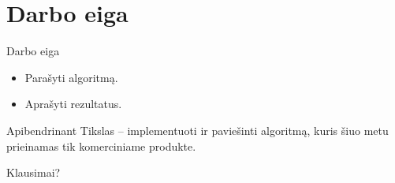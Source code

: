 \documentclass[14pt]{beamer}
\begin{document}
\section{Darbo eiga}

\begin{frame}{Darbo eiga}
    \begin{itemize}[<+->]
        \item Parašyti algoritmą.
        \item Aprašyti rezultatus.
    \end{itemize}
\end{frame}

\begin{frame}{Apibendrinant}
    Tikslas -- implementuoti ir paviešinti algoritmą, kuris šiuo metu
    prieinamas tik komerciniame produkte.
\end{frame}

\begin{frame}{Klausimai?}
\end{frame}
\end{document}
